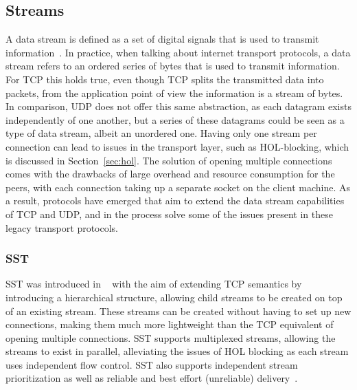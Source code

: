 \documentclass[english, 12pt, a4paper, elec, utf8, a-2b, online]{aaltothesis}
\begin{document}
\subsection{Streams}
\label{sec:streams}
A data stream is defined as a set of digital signals that is used to transmit
information~\cite{data_stream}. In practice, when talking about internet
transport protocols, a data stream refers to an ordered series of bytes that is
used to transmit information. For TCP this holds true, even though TCP splits
the transmitted data into packets, from the application point of view the
information is a stream of bytes. In comparison, UDP does not offer this same
abstraction, as each datagram exists independently of one another, but a series
of these datagrams could be seen as a type of data stream, albeit an unordered one.
Having only one stream per connection can lead to issues in the transport layer, such as HOL-blocking,
which is discussed in Section~\ref{sec:hol}. The solution of opening multiple
connections comes with the drawbacks of large overhead and resource consumption for
the peers, with each connection taking up a separate socket on the client machine.
As a result, protocols have emerged that aim to extend the data stream capabilities
of TCP and UDP, and in the process solve some of the issues present in these legacy
transport protocols.

\subsubsection{SST}

SST was introduced in ~\cite{sst} with the aim
of extending TCP semantics by introducing a hierarchical structure, allowing
child streams to be created on top of an existing stream. These streams can
be created without having to set up new connections, making them much more lightweight
than the TCP equivalent of opening multiple connections. SST supports multiplexed streams, allowing the streams
to exist in parallel, alleviating the issues of HOL blocking as each stream uses
independent flow control. SST also supports independent stream prioritization
as well as reliable and best effort (unreliable) delivery~\cite{sst}.
\end{document}
